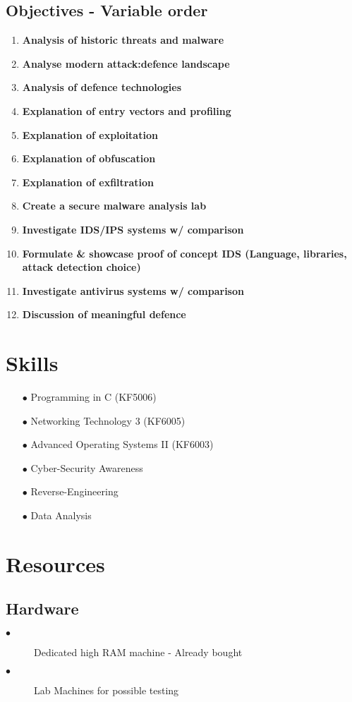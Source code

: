 \subsection{Objectives - Variable order}
\begin{enumerate}
	\item \textbf{Analysis of historic threats and malware}
	\item \textbf{Analyse modern attack:defence landscape}
	\item \textbf{Analysis of defence technologies}
	\item \textbf{Explanation of entry vectors and profiling}
	\item \textbf{Explanation of exploitation}
	\item \textbf{Explanation of obfuscation}
	\item \textbf{Explanation of exfiltration}
	\item \textbf{Create a secure malware analysis lab}
	\item \textbf{Investigate IDS/IPS systems w/ comparison}
	\item \textbf{Formulate & showcase proof of concept IDS (Language, libraries, attack detection choice)}
	\item \textbf{Investigate antivirus systems w/ comparison}
	\item \textbf{Discussion of meaningful defence}
\end{enumerate}

\section{Skills}
\begin{enumerate}
	\item [$\bullet$] Programming in C (KF5006)
	\item [$\bullet$] Networking Technology 3 (KF6005)
	\item [$\bullet$] Advanced Operating Systems II (KF6003)
	\item [$\bullet$] Cyber-Security Awareness
	\item [$\bullet$] Reverse-Engineering
	\item [$\bullet$] Data Analysis
\end{enumerate}

\section{Resources}
\subsection{Hardware}
\begin{description}
	\item[$\bullet$] Dedicated high RAM machine - Already bought
	\item[$\bullet$] Lab Machines for possible testing
\end{description}

